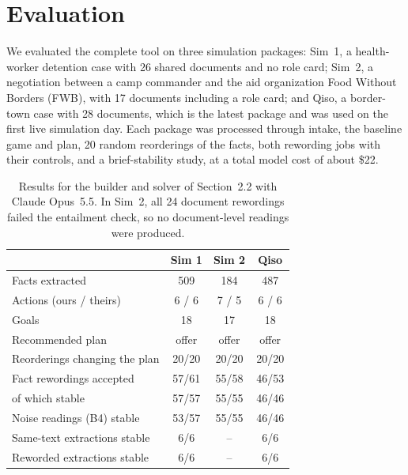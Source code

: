 \documentclass[10pt,twocolumn,letterpaper]{article}
\begin{document}
\section{Evaluation}

We evaluated the complete tool on three simulation packages: Sim~1, a health-worker detention case with 26 shared documents and no role card; Sim~2, a negotiation between a camp commander and the aid organization Food Without Borders (FWB), with 17 documents including a role card; and Qiso, a border-town case with 28 documents, which is the latest package and was used on the first live simulation day. Each package was processed through intake, the baseline game and plan, 20 random reorderings of the facts, both rewording jobs with their controls, and a brief-stability study, at a total model cost of about \$22.

\begin{table}[t]
\centering\footnotesize
\setlength{\tabcolsep}{2.5pt}
\begin{tabular}{@{}lccc@{}}
\toprule
 & Sim 1 & Sim 2 & Qiso \\
\midrule
Facts extracted & 509 & 184 & 487 \\
Actions (ours / theirs) & 6 / 6 & 7 / 5 & 6 / 6 \\
Goals & 18 & 17 & 18 \\
Recommended plan & offer & offer & offer \\
Reorderings changing the plan & 20/20 & 20/20 & 20/20 \\
Fact rewordings accepted & 57/61 & 55/58 & 46/53 \\
\quad of which stable & 57/57 & 55/55 & 46/46 \\
Noise readings (B4) stable & 53/57 & 55/55 & 46/46 \\
Same-text extractions stable & 6/6 & -- & 6/6 \\
Reworded extractions stable & 6/6 & -- & 6/6 \\
\bottomrule
\end{tabular}
\caption{\footnotesize Results for the builder and solver of Section~2.2 with Claude Opus~5.5. In Sim~2, all 24 document rewordings failed the entailment check, so no document-level readings were produced.}
\label{tab:sims}
\end{table}
\end{document}
